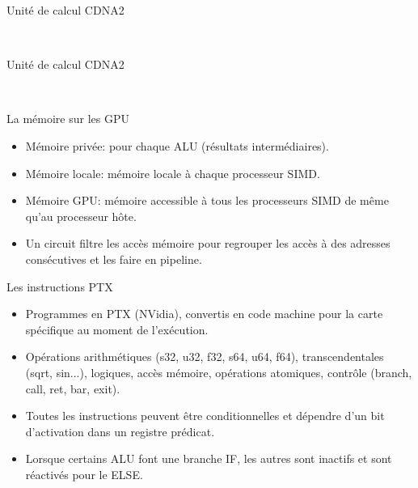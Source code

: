 \documentclass[10pt]{beamer}
\begin{document}
\begin{frame}[fragile]{Unité de calcul CDNA2}

  \begin{center} %
     \\
  \end{center}
\end{frame}

\begin{frame}[fragile]{Unité de calcul CDNA2}

  \begin{center} %
     \\
  \end{center}
\end{frame}

\begin{frame}{La mémoire sur les GPU}

  \begin{itemize}
    \item Mémoire privée: pour chaque ALU (résultats intermédiaires).

    \item Mémoire locale: mémoire locale à chaque processeur SIMD.

    \item Mémoire GPU: mémoire accessible à tous les processeurs SIMD de même qu'au processeur hôte.

    \item Un circuit filtre les accès mémoire pour regrouper les accès à des adresses consécutives et les faire en pipeline.
  \end{itemize}
\end{frame}

\begin{frame}{Les instructions PTX}

  \begin{itemize}
    \item Programmes en PTX (NVidia), convertis en code machine pour la carte spécifique au moment de l'exécution.

    \item Opérations arithmétiques (s32, u32, f32, s64, u64, f64), transcendentales (sqrt, sin...), logiques, accès mémoire, opérations atomiques, contrôle (branch, call, ret, bar, exit).

    \item Toutes les instructions peuvent être conditionnelles et dépendre d'un bit d'activation dans un registre prédicat.

    \item Lorsque certains ALU font une branche IF, les autres sont inactifs et sont réactivés pour le ELSE.
  \end{itemize}
\end{frame}
\end{document}
